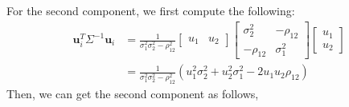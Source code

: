 \documentclass[aap,authoryear, preprint]{imsart}
\numberwithin{equation}{section}
\theoremstyle{plain}
\begin{document}
For the second component, we first compute the following:
\begin{align*}
\bm{u}_i^T\Sigma^{-1}\bm{u}_i &= \frac{1}{\sigma_1^2 \sigma_2^2 - \rho_{12}^2}\begin{bmatrix}u_1 & u_2 \end{bmatrix}  \begin{bmatrix} \sigma_2^2 & -\rho_{12} \\ -\rho_{12} & \sigma_1^2 \end{bmatrix}  \begin{bmatrix}u_1\\ u_2 \end{bmatrix}\\
	&= \frac{1}{\sigma_1^2\sigma_2^2 - \rho_{12}^2} ( u_1^2\sigma_2^2 + u_2^2\sigma_1^2 - 2u_1u_2\rho_{12})
\end{align*}
Then, we can get the second component as follows,
\end{document}
